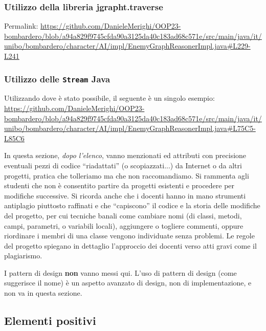 \documentclass[a4paper,12pt]{report}
\begin{document}
\par
\subsubsection{Utilizzo della libreria jgrapht.traverse}
Permalink: \url{https://github.com/DanieleMerighi/OOP23-bombardero/blob/a94a829f9745cfda90a3125da40c183ad68c571e/src/main/java/it/unibo/bombardero/character/AI/impl/EnemyGraphReasonerImpl.java#L229-L241}

\par
\subsubsection{Utilizzo delle \texttt{Stream} Java}
Utilizzando dove è stato possibile, il seguente è un singolo esempio: 
\url{https://github.com/DanieleMerighi/OOP23-bombardero/blob/a94a829f9745cfda90a3125da40c183ad68c571e/src/main/java/it/unibo/bombardero/character/AI/impl/EnemyGraphReasonerImpl.java#L75C5-L85C6}

%
In questa sezione, \textit{dopo l'elenco},
vanno menzionati ed attributi con precisione eventuali pezzi di codice ``riadattati'' (o scopiazzati...) da Internet o da altri progetti,
pratica che tolleriamo ma che non raccomandiamo.
%
Si rammenta agli studenti che non è consentito partire da progetti esistenti e procedere per modifiche successive.
%
Si ricorda anche che i docenti hanno in mano strumenti antiplagio piuttosto raffinati e che ``capiscono'' il codice e la storia delle modifiche del progetto,
per cui tecniche banali come cambiare nomi (di classi, metodi, campi, parametri, o variabili locali),
aggiungere o togliere commenti,
oppure riordinare i membri di una classe vengono individuate senza problemi.
%
Le regole del progetto spiegano in dettaglio l'approccio dei docenti verso atti gravi come il plagiarismo.

I pattern di design \textbf{non} vanno messi qui.
%
L'uso di pattern di design (come suggerisce il nome) è un aspetto avanzato di design, non di implementazione,
e non va in questa sezione.

\subsection*{Elementi positivi}
\end{document}
